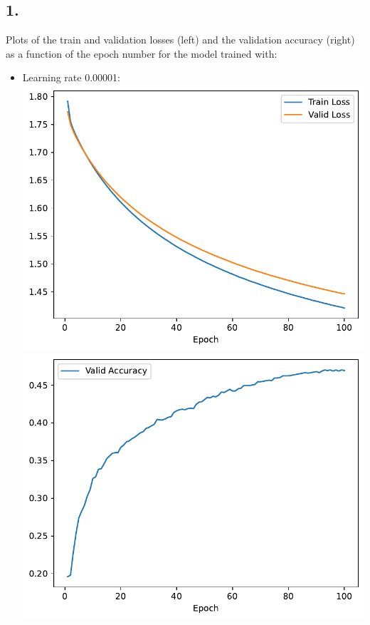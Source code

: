 \documentclass[12pt,a4paper]{article}
\begin{document}
    \subsection{1.}
        Plots of the train and validation losses (left) and the validation accuracy (right) as a function of the epoch number for the model trained with:
        \begin{itemize}
            \item Learning rate 0.00001: \\
                \includegraphics[width=\imagewidth]{q2/q2_1_lr-0.00001-training-loss.pdf}
                \includegraphics[width=\imagewidth]{q2/q2_1_lr-0.00001-validation-accuracy.pdf}

\end{itemize}
\end{document}
